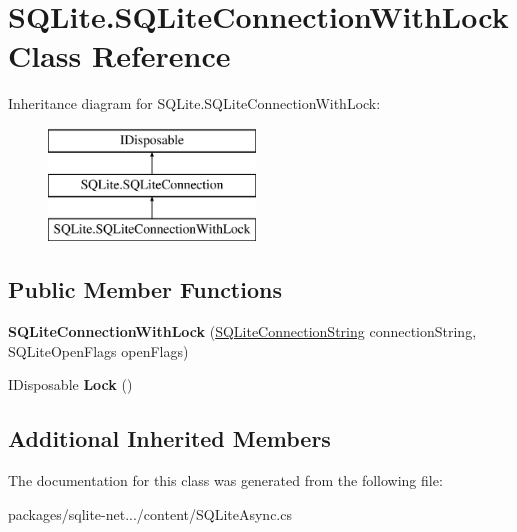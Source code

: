 \hypertarget{classSQLite_1_1SQLiteConnectionWithLock}{}\section{S\+Q\+Lite.\+S\+Q\+Lite\+Connection\+With\+Lock Class Reference}
\label{classSQLite_1_1SQLiteConnectionWithLock}
Inheritance diagram for S\+Q\+Lite.\+S\+Q\+Lite\+Connection\+With\+Lock\+:\begin{figure}[H]
\begin{center}
\leavevmode
\includegraphics[height=3.000000cm]{classSQLite_1_1SQLiteConnectionWithLock}
\end{center}
\end{figure}
\subsection*{Public Member Functions}
\begin{DoxyCompactItemize}
\item 
\hypertarget{classSQLite_1_1SQLiteConnectionWithLock_ad30600291e3accc913d7bc2818f24d3b}{}{\bfseries S\+Q\+Lite\+Connection\+With\+Lock} (\hyperlink{classSQLite_1_1SQLiteConnectionString}{S\+Q\+Lite\+Connection\+String} connection\+String, S\+Q\+Lite\+Open\+Flags open\+Flags)\label{classSQLite_1_1SQLiteConnectionWithLock_ad30600291e3accc913d7bc2818f24d3b}

\item 
\hypertarget{classSQLite_1_1SQLiteConnectionWithLock_ad38e795a2b94ecd709b9b60e2c4d3e4e}{}I\+Disposable {\bfseries Lock} ()\label{classSQLite_1_1SQLiteConnectionWithLock_ad38e795a2b94ecd709b9b60e2c4d3e4e}

\end{DoxyCompactItemize}
\subsection*{Additional Inherited Members}


The documentation for this class was generated from the following file\+:\begin{DoxyCompactItemize}
\item 
packages/sqlite-\/net.../content/S\+Q\+Lite\+Async.\+cs\end{DoxyCompactItemize}
